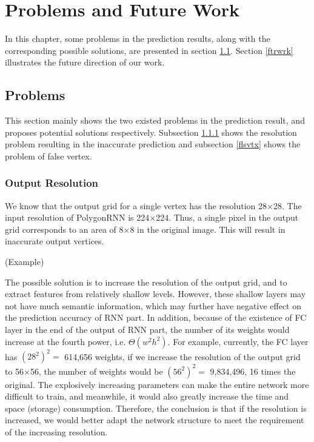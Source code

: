 \chapter{Problems and Future Work}\label{prbftr}
In this chapter, some problems in the prediction results, along with the corresponding possible solutions, are presented in section \ref{prblms}. Section \ref{ftrwrk} illustrates the future direction of our work.

\section{Problems}\label{prblms}
This section mainly shows the two existed problems in the prediction result, and proposes potential solutions respectively. Subsection \ref{outres} shows the resolution problem resulting in the inaccurate prediction and subsection \ref{flsvtx} shows the problem of false vertex.

\subsection{Output Resolution}\label{outres}
We know that the output grid for a single vertex has the resolution 28$\times$28. The input resolution of PolygonRNN is 224$\times$224. Thus, a single pixel in the output grid corresponds to an area of 8$\times$8 in the original image. This will result in inaccurate output vertices.

(Example)

The possible solution is to increase the resolution of the output grid, and to extract features from relatively shallow levels. However, these shallow layers may not have much semantic information, which may further have negative effect on the prediction accuracy of RNN part. In addition, because of the existence of FC layer in the end of the output of RNN part, the number of its weights would increase at the fourth power, i.e. $\Theta(w^2h^2)$. For example, currently, the FC layer has $(28^2)^2 = $ 614,656 weights, if we increase the resolution of the output grid to 56$\times$56, the number of weights would be $(56^2)^2 = $ 9,834,496, 16 times the original. The explosively increasing parameters can make the entire network more difficult to train, and meanwhile, it would also greatly increase the time and space (storage) consumption. Therefore, the conclusion is that if the resolution is increased, we would better adapt the network structure to meet the requirement of the increasing resolution.

